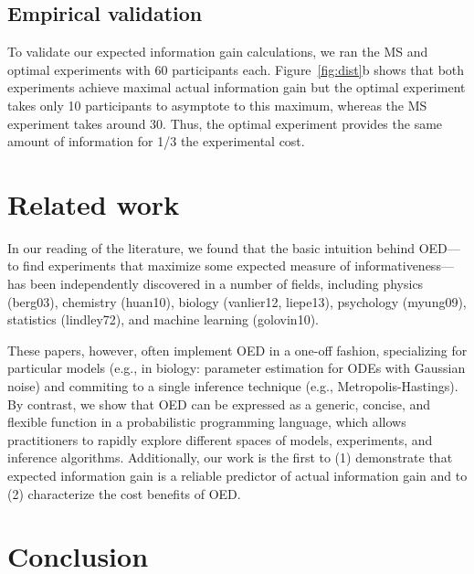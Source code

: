 \documentclass{article}
\begin{document}
\subsection{Empirical validation}

To validate our expected information gain calculations, we ran the MS and optimal experiments with 60 participants each.
Figure~\ref{fig:dist}b shows that both experiments achieve maximal actual information gain but the optimal experiment takes only 10 participants to asymptote to this maximum, whereas the MS experiment takes around 30.
Thus, the optimal experiment provides the same amount of information for 1/3 the experimental cost.


\section{Related work}

In our reading of the literature, we found that the basic intuition behind OED---to find experiments that maximize some expected measure of informativeness---has been independently discovered in a number of fields, including physics (berg03), chemistry (huan10), biology (vanlier12, liepe13), psychology (myung09), statistics (lindley72), and machine learning (golovin10).

These papers, however, often implement OED in a one-off fashion, specializing for  particular models (e.g., in biology: parameter estimation for ODEs with Gaussian noise) and commiting to a single inference technique (e.g., Metropolis-Hastings).
By contrast, we show that OED can be expressed as a generic, concise, and flexible function in a probabilistic programming language, which allows practitioners to rapidly explore different spaces of models, experiments, and inference algorithms.
Additionally, our work is the first to (1) demonstrate that expected information gain is a reliable predictor of actual information gain and to (2) characterize the cost benefits of OED.

\section{Conclusion}
\end{document}
